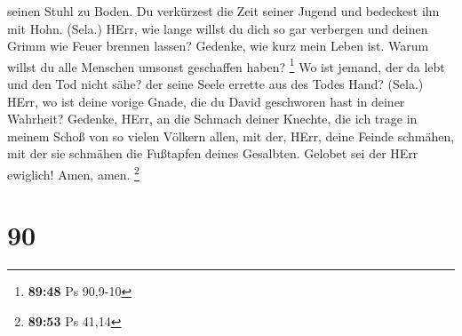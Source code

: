 seinen Stuhl zu Boden.  Du verkürzest die Zeit seiner
Jugend und bedeckest ihn mit Hohn. (Sela.)  HErr, wie lange
willst du dich so gar verbergen und deinen Grimm wie Feuer brennen
lassen?  Gedenke, wie kurz mein Leben ist. Warum willst du
alle Menschen umsonst geschaffen haben? \footnote{\textbf{89:48} Ps
  90,9-10}  Wo ist jemand, der da lebt und den Tod nicht
sähe? der seine Seele errette aus des Todes Hand? (Sela.) 
HErr, wo ist deine vorige Gnade, die du David geschworen hast in deiner
Wahrheit?  Gedenke, HErr, an die Schmach deiner Knechte,
die ich trage in meinem Schoß von so vielen Völkern allen, 
mit der, HErr, deine Feinde schmähen, mit der sie schmähen die Fußtapfen
deines Gesalbten.  Gelobet sei der HErr ewiglich! Amen,
amen. \footnote{\textbf{89:53} Ps 41,14}

\hypertarget{section-29}{%
\section{90}\label{section-29}}

